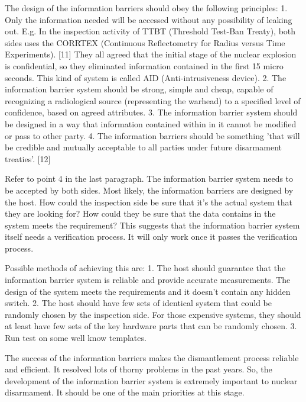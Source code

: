 \documentclass[twoside,titlepage,11pt,twocolumn,a4paper]{article}
\begin{document}
The design of the information barriers should obey the following
principles: 1. Only the information needed will be accessed without
any possibility of leaking out. E.g. In the inspection activity of
TTBT (Threshold Test-Ban Treaty), both sides uses the CORRTEX
(Continuous Reflectometry for Radius versus Time Experiments). [11]
They all agreed that the initial stage of the nuclear explosion is
confidential, so they eliminated information contained in the first 15
micro seconds. This kind of system is called AID (Anti-intrusiveness
device).  2. The information barrier system should be strong, simple
and cheap, capable of recognizing a radiological source (representing
the warhead) to a specified level of confidence, based on agreed
attributes.  3. The information barrier system should be designed in a
way that information contained within in it cannot be modified or pass
to other party.  4. The information barriers should be something 'that
will be credible and mutually acceptable to all parties under future
disarmament treaties'. [12]

Refer to point 4 in the last paragraph. The information barrier system
needs to be accepted by both sides. Most likely, the information
barriers are designed by the host. How could the inspection side be
sure that it's the actual system that they are looking for? How could
they be sure that the data contains in the system meets the
requirement? This suggests that the information barrier system itself
needs a verification process. It will only work once it passes the
verification process.

Possible methods of achieving this are: 1. The host should guarantee
that the information barrier system is reliable and provide accurate
measurements. The design of the system meets the requirements and it
doesn't contain any hidden switch.  2. The host should have few sets
of identical system that could be randomly chosen by the inspection
side. For those expensive systems, they should at least have few sets
of the key hardware parts that can be randomly chosen.  3. Run test on
some well know templates.

The success of the information barriers makes the dismantlement
process reliable and efficient. It resolved lots of thorny problems in
the past years. So, the development of the information barrier system
is extremely important to nuclear disarmament. It should be one of the
main priorities at this stage.
\end{document}
